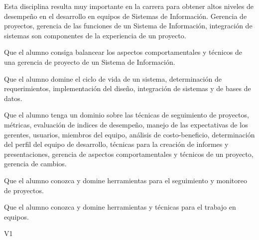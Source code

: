 \begin{syllabus}


\begin{justification}
	Esta disciplina resulta muy importante en la carrera para obtener altos niveles de desempeño en el desarrollo en equipos de Sistemas de Información. Gerencia de proyectos, gerencia de las funciones de un Sistema de Información, integración de sistemas son componentes de la experiencia de un proyecto.
	\end{justification}
	
	\begin{goals}
	\item Que el alumno consiga balancear los aspectos comportamentales y técnicos de una gerencia de proyecto de un Sistema de Información.
	\item Que el alumno domine el ciclo de vida de un sistema, determinación de requerimientos, implementación del diseño, integración de sistemas y de bases de datos.
	\item Que el alumno tenga un dominio sobre las técnicas de seguimiento de proyectos, métricas, evaluación de indices de desempeño, manejo de las expectativas de los gerentes, usuarios, miembros del equipo, análisis de costo-beneficio, determinación del perfil del equipo de desarrollo, técnicas para la creación de informes y presentaciones, gerencia de aspectos comportamentales y técnicos de un proyecto, gerencia de cambios.
	\item Que el alumno conozca y domine herramientas para el seguimiento  y monitoreo de proyectos.
	\item Que el alumno conozca y domine herramientas y técnicas para el trabajo en equipos.
	\end{goals}
	
	\begin{outcomes}{V1}
		\item {}
		\item {}
		\item {}
		\item {}
		\item {}
		\item {}
		\item {}
		\item {}
	\end{outcomes}
	

\end{syllabus}
